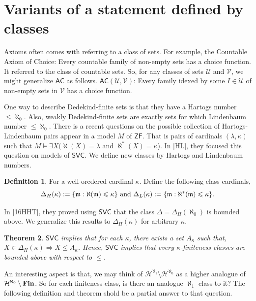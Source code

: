 \documentclass{amsart}
\newcommand{\AC}{\ensuremath{\mathsf{AC}}}
\newcommand{\SVC}{\ensuremath{\mathsf{SVC}}}
\newcommand{\ZF}{\ensuremath{\mathsf{ZF}}}
\newcommand{\Fin}{\textbf{\textup{Fin}}}
\renewcommand{\leq}{\leqslant}
\newcommand{\1}{\ensuremath{\mathds{1}}}
\theoremstyle{plain}
\newtheorem{thm}{Theorem}[section]
\theoremstyle{boldrk}
\theoremstyle{definition}
\newtheorem{defn}[thm]{Definition}
\begin{document}
\section{Variants of a statement defined by classes}\label{s:axiom}

Axioms often comes with referring to a class of sets. For example, the Countable Axiom of Choice: Every countable family of non-empty sets has a choice function. It referred to the class of countable sets. So, for any classes of sets $\mathcal{U}$ and $\mathcal{V}$, we might generalize $\AC$ as follows. $\AC(\mathcal{U},\mathcal{V})$: Every family idexed by some $I\in\mathcal{U}$ of non-empty sets in $\mathcal{V}$ has a choice function.


One way to describe Dedekind-finite sets is that they have a Hartogs number $\leq\aleph_{0}$. Also, weakly Dedekind-finite sets are exactly sets for which Lindenbaum number $\leq\aleph_{0}$. There is a recent questions on the possible collection of Hartogs-Lindenbaum pairs appear in a model $M$ of $\ZF$. That is pairs of cardinals $(\lambda,\kappa)$ such that $M\vDash\exists X( \aleph(X)=\lambda \text{ and }\aleph^{*}(X)=\kappa$). In [HL], they focused this question on models of $\SVC$. We define new classes by Hartogs and Lindenbaum numbers.


\begin{defn}For a well-oredered cardinal $\kappa$. Define the following class cardinals,
\begin{equation*}
    \Delta_{H}({\kappa}):=\{\frak{m}:\aleph(\frak{m})\leq\kappa\}\text{ and }
    \Delta_{L}({\kappa}):=\{\frak{m}:\aleph^{*}(\frak{m})\leq\kappa\}.
\end{equation*}
\end{defn}

In [16HHT], they proved using $\SVC$ that the class $\Delta=\Delta_{H}(\aleph_{0})$ is bounded above. We generalize this results to $\Delta_{H}(\kappa)$ for arbitrary $\kappa$.


\begin{thm}
$\SVC$ implies that for each $\kappa$, there exists a set $A_{\kappa}$ such that, $X\in\Delta_{H}(\kappa)\Rightarrow X\leq A_{\kappa}$. Hence, $\SVC$ implies that every $\kappa$-finiteness classes are bounded above with respect to $\leq$.    
\end{thm}


An interesting aspect is that, we may think of $\mathcal{H}^{\aleph_{1}}\setminus\mathcal{H}^{\aleph_{0}}$ as a higher analogue of $\mathcal{H}^{\aleph_{0}}\setminus\Fin$. So for each finiteness class, is there an analogue $\aleph_{1}$-class to it? The following definition and theorem shold be a partial answer to that question.
\end{document}
